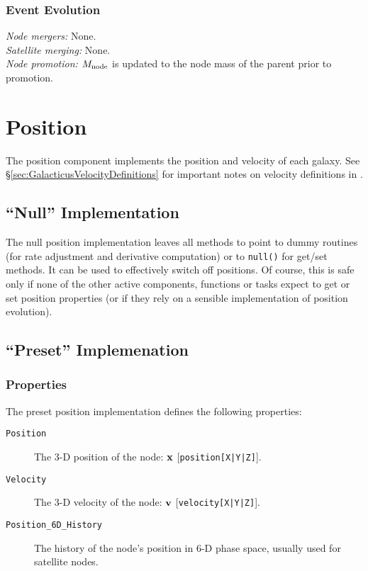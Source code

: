 \subsubsection{Event Evolution}

\noindent\emph{Node mergers:} None.\\

\noindent\emph{Satellite merging:} None.\\

\noindent\emph{Node promotion:} $M_{\rm node}$ is updated to the \gls{node} mass of the parent prior to promotion.\\

\section{Position}\label{sec:ComponentPosition}

The position \gls{component} implements the position and velocity of each galaxy. See \S\ref{sec:GalacticusVelocityDefinitions} for important notes on velocity definitions in \glc.

\subsection{``Null'' Implementation}

The null position implementation leaves all methods to point to dummy routines (for rate adjustment and derivative computation) or to {\tt null()} for get/set methods. It can be used to effectively switch off positions. Of course, this is safe only if none of the other active components, functions or tasks expect to get or set position properties (or if they rely on a sensible implementation of position evolution).

\subsection{``Preset'' Implemenation}

\subsubsection{Properties}

The preset position implementation defines the following properties:
\begin{description}
 \item [{\tt Position}] The 3-D position of the node: ${\bf x}$ [{\tt position[X|Y|Z]}].
 \item [{\tt Velocity}] The 3-D velocity of the node: ${\bf v}$ [{\tt velocity[X|Y|Z]}].
 \item [{\tt Position\_6D\_History}] The history of the node's position in 6-D phase space, usually used for satellite nodes.
\end{description}

